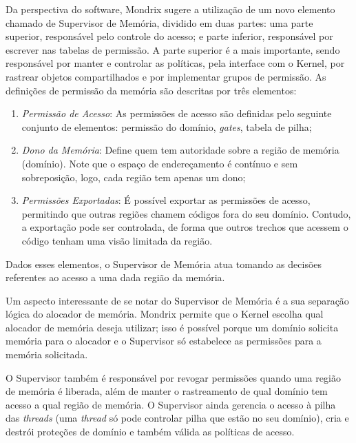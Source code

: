 Da perspectiva do software, Mondrix \citep{mondrix} sugere a utilização de um
novo elemento chamado de Supervisor de Memória, dividido em duas partes:
uma parte superior, responsável pelo controle do acesso; e parte inferior, responsável
por escrever nas tabelas de permissão. A parte superior é a mais importante,
sendo responsável por manter e controlar as políticas, pela interface com o Kernel,
por rastrear objetos compartilhados e por implementar grupos de permissão. As
definições de permissão da memória são descritas por três elementos:

\begin{enumerate}
	\item \emph{Permissão de Acesso}: As permissões de acesso são definidas pelo
				seguinte conjunto de elementos: permissão do domínio, \emph{gates},
        tabela de pilha;
	\item \emph{Dono da Memória}: Define quem tem autoridade sobre a região de
				memória (domínio). Note que o espaço de endereçamento é contínuo e sem
				sobreposição, logo, cada região tem apenas um dono;
	\item \emph{Permissões Exportadas}: É possível exportar as permissões de
				acesso, permitindo que outras regiões chamem códigos
				fora do seu domínio. Contudo, a exportação pode ser controlada, de forma
				que outros trechos que acessem o código tenham uma visão limitada da
				região.
\end{enumerate}

Dados esses elementos, o Supervisor de Memória atua tomando as decisões
referentes ao acesso a uma dada região da memória.

Um aspecto interessante de se notar do Supervisor de Memória é a sua separação
lógica do alocador de memória. Mondrix permite que o Kernel escolha qual
alocador de memória deseja utilizar; isso é possível porque um domínio solicita
memória para o alocador e o Supervisor só estabelece as permissões para a
memória solicitada.

O Supervisor também é responsável por revogar permissões quando uma região de
memória é liberada, além de manter o rastreamento de qual domínio tem acesso a
qual região de memória. O Supervisor ainda gerencia o acesso à pilha
das \emph{threads} (uma \emph{thread} só pode controlar pilha que estão
no seu domínio), cria e destrói proteções de domínio e também válida as
políticas de acesso.

